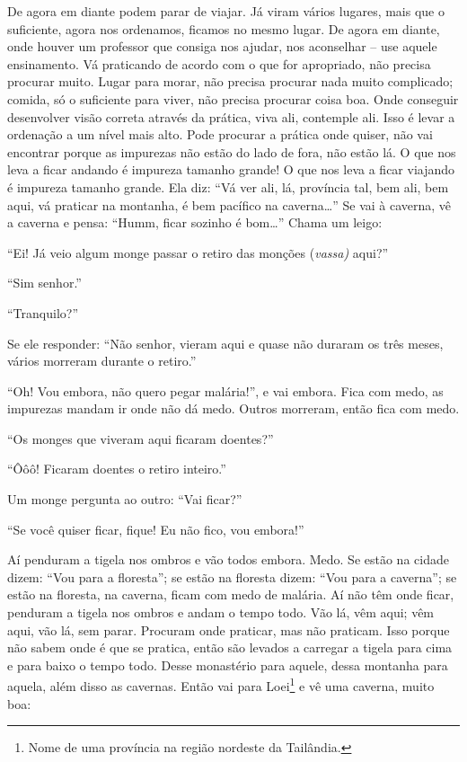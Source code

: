 De agora em diante podem parar de viajar. Já viram vários lugares,
mais que o suficiente, agora nos ordenamos, ficamos no mesmo lugar. De
agora em diante, onde houver um professor que consiga nos ajudar, nos
aconselhar – use aquele ensinamento. Vá praticando de acordo com o que
for apropriado, não precisa procurar muito. Lugar para morar, não
precisa procurar nada muito complicado; comida, só o suficiente para
viver, não precisa procurar coisa boa. Onde conseguir desenvolver visão
correta através da prática, viva ali, contemple ali. Isso é levar a
ordenação a um nível mais alto. Pode procurar a prática onde quiser,
não vai encontrar porque as impurezas não estão do lado de fora, não
estão lá. O que nos leva a ficar andando é impureza tamanho grande! O
que nos leva a ficar viajando é impureza tamanho grande. Ela diz: “Vá
ver ali, lá, província tal, bem ali, bem aqui, vá praticar na montanha,
é bem pacífico na caverna…” Se vai à caverna, vê a caverna e pensa:
“Humm, ficar sozinho é bom…” Chama um leigo: 

“Ei! Já veio algum monge passar o retiro das monções (\textit{vassa)
}aqui?”

“Sim senhor.” 

“Tranquilo?” 

Se ele responder: “Não senhor, vieram aqui e quase não duraram os
três meses, vários morreram durante o retiro.” 

“Oh! Vou embora, não quero pegar malária!”, e vai embora. Fica com
medo, as impurezas mandam ir onde não dá medo. Outros morreram, então
fica com medo. 

“Os monges que viveram aqui ficaram doentes?” 

“Ôôô! Ficaram doentes o retiro inteiro.”

Um monge pergunta ao outro: “Vai ficar?” 

“Se você quiser ficar, fique! Eu não fico, vou embora!”

Aí penduram a tigela nos ombros e vão todos embora. Medo. Se estão
na cidade dizem: “Vou para a floresta”; se estão na floresta dizem:
“Vou para a caverna”; se estão na floresta, na caverna, ficam com medo
de malária. Aí não têm onde ficar, penduram a tigela nos ombros e andam
o tempo todo. Vão lá, vêm aqui; vêm aqui, vão lá, sem parar. Procuram
onde praticar, mas não praticam. Isso porque não sabem onde é que se
pratica, então são levados a carregar a tigela para cima e para baixo o
tempo todo. Desse monastério para aquele, dessa montanha para aquela,
além disso as cavernas. Então vai para Loei\footnote{Nome de uma
província na região nordeste da Tailândia.} e vê uma caverna, muito
boa: 

